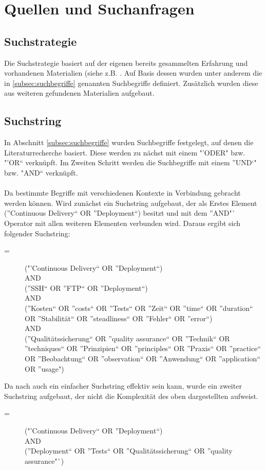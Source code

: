 \section{Quellen und Suchanfragen}
\label{sec:QuellenUndSuchanfragen}

\subsection{Suchstrategie}
\label{subsec:suchstrategie}
Die Suchstrategie basiert auf der eigenen bereits gesammelten Erfahrung und vorhandenen Materialien (siehe z.B. \cite{EWolff:CD}. Auf Basis dessen wurden unter anderem die in \ref{subsec:suchbegriffe}  genannten Suchbegriffe definiert. Zusätzlich wurden diese aus weiteren gefundenen Materialien aufgebaut.

\subsection{Suchstring}
\label{subsec:suchstring}
In Abschnitt \ref{subsec:suchbegriffe}  wurden Suchbegriffe festgelegt, auf denen die Literaturrecherche basiert. Diese werden zu nächst mit einem "'ODER" bzw. "'OR"` verknüpft. Im Zweiten Schritt werden die Suchbegriffe mit einem "'UND`" bzw. "AND"` verknüpft.
\\\\
Da bestimmte Begriffe mit verschiedenen Kontexte in Verbindung gebracht werden können. Wird zunächst ein Suchstring aufgebaut, der als Erstes Element ("'Continuous Delivery"` OR "'Deployment"`) besitzt und mit dem "'AND"` Operator mit allen weiteren Elementen verbunden wird. Daraus ergibt sich folgender Suchstring:

\begin{description}
	\item[ =] ("'Continuous Delivery"` OR "'Deployment"`) \\AND\\ ("'SSH"` OR "'FTP"` OR "'Deployment"`) \\AND\\ ("'Kosten"` OR "'costs"` OR "'Tests"` OR "'Zeit"` OR "'time"` OR "'duration"` OR "'Stabilität"` OR "'steadliness"` OR "'Fehler"` OR "'error"`) \\AND\\ ("'Qualitätssicherung"` OR "'quality assurance"` OR "'Technik"` OR "'techniques"` OR "'Prinzipien"` OR "'principles"` OR "'Praxis"` OR "'practice"` OR "'Beobachtung"` OR "'observation"` OR "'Anwendung"` OR "'application"` OR "'usage")
\end{description}
Da nach \cite[vgl. S. 26]{Kitchenham2007} auch ein einfacher Suchstring effektiv sein kann, wurde ein zweiter Suchstring aufgebaut, der nicht die Komplexität des oben dargestellten aufweist.
\begin{description}
	\item[ =] ("'Continuous Delivery"` OR "'Deployment"`) \\AND\\ ("'Deployment"` OR "'Tests"` OR "'Qualitätssicherung"` OR "'quality assurance"`)
\end{description}

